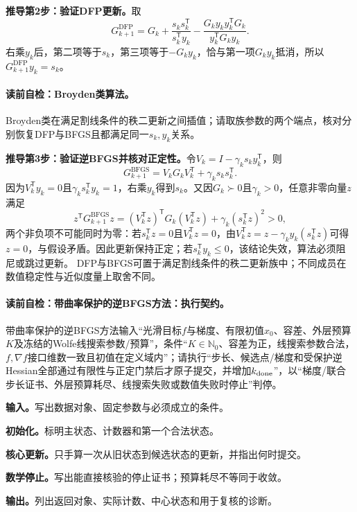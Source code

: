 \textbf{推导第2步：验证DFP更新。}取
\[
G_{k+1}^{\mathrm{DFP}}=G_k+\frac{s_ks_k^{\mathsf T}}{s_k^{\mathsf T}y_k}
-\frac{G_ky_ky_k^{\mathsf T}G_k}{y_k^{\mathsf T}G_ky_k}.
\]
右乘$y_k$后，第二项等于$s_k$，第三项等于$-G_ky_k$，恰与第一项$G_ky_k$抵消，所以$G_{k+1}^{\mathrm{DFP}}y_k=s_k$。

\paragraph{读前自检：Broyden类算法。}Broyden类在满足割线条件的秩二更新之间插值；请取族参数的两个端点，核对分别恢复DFP与BFGS且都满足同一$s_k,y_k$关系。\par

\textbf{推导第3步：验证逆BFGS并核对正定性。}令$V_k=I-\gamma_ks_ky_k^{\mathsf T}$，则
\[
G_{k+1}^{\mathrm{BFGS}}=V_kG_kV_k^{\mathsf T}+\gamma_ks_ks_k^{\mathsf T}.
\]
因为$V_k^{\mathsf T}y_k=0$且$\gamma_ks_k^{\mathsf T}y_k=1$，右乘$y_k$得到$s_k$。又因$G_k\succ0$且$\gamma_k>0$，任意非零向量$z$满足
\[
z^{\mathsf T}G_{k+1}^{\mathrm{BFGS}}z
=(V_k^{\mathsf T}z)^{\mathsf T}G_k(V_k^{\mathsf T}z)
+\gamma_k(s_k^{\mathsf T}z)^2>0,
\]
两个非负项不可能同时为零：若$s_k^{\mathsf T}z=0$且$V_k^{\mathsf T}z=0$，由$V_k^{\mathsf T}z=z-\gamma_ky_k(s_k^{\mathsf T}z)$可得$z=0$，与假设矛盾。因此更新保持正定；若$s_k^{\mathsf T}y_k\le0$，该结论失效，算法必须阻尼或跳过更新。
DFP与BFGS可置于满足割线条件的秩二更新族中；不同成员在数值稳定性与近似度量上取舍不同。

\paragraph{读前自检：带曲率保护的逆BFGS方法：执行契约。}带曲率保护的逆BFGS方法输入“光滑目标$f$与梯度、有限初值$x_0$、容差、外层预算$K$及冻结的Wolfe线搜索参数/预算”，条件“$K\in\mathbb N_0$、容差为正，线搜索参数合法，$f,\nabla f$接口维数一致且初值在定义域内”；请执行“步长、候选点/梯度和受保护逆Hessian全部通过有限性与正定门禁后才原子提交，并增加$k_{\rm done}$”，以“梯度/联合步长证书、外层预算耗尽、线搜索失败或数值失败时停止”判停。\par
\begin{keypointbox}[title={带曲率保护的逆BFGS方法：五步阅读}]
\textbf{输入。}写出数据对象、固定参数与必须成立的条件。\par
\textbf{初始化。}标明主状态、计数器和第一个合法状态。\par
\textbf{核心更新。}只手算一次从旧状态到候选状态的更新，并指出何时提交。\par
\textbf{数学停止。}写出能直接核验的停止证书；预算耗尽不等同于收敛。\par
\textbf{输出。}列出返回对象、实际计数、中心状态和用于复核的诊断。
\end{keypointbox}

